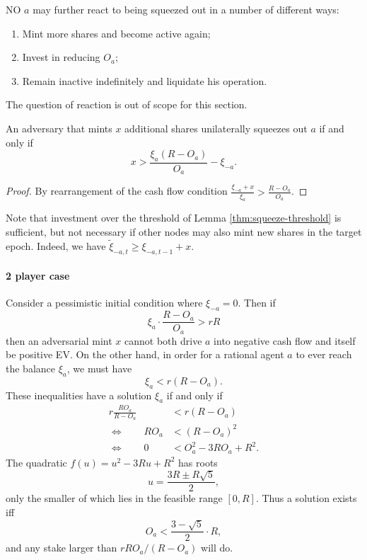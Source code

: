 \begin{remark}
  
  NO $a$ may further react to being squeezed out in a number of different ways:
  \begin{enumerate}
    \item Mint more shares and become active again;
    \item Invest in reducing $O_a$;
    \item Remain inactive indefinitely and liquidate his operation.
  \end{enumerate}
  The question of reaction is out of scope for this section.

\end{remark}

\begin{lemma}
  \label{thm:squeeze-threshold}

  An adversary that mints $x$ additional shares unilaterally squeezes out $a$ if and only if
  \[
    x > \frac { \xi_a(R-O_a) } {O_a} - \xi_{-a}.
  \]

\end{lemma}
%
\begin{proof}

  By rearrangement of the cash flow condition $\frac{\xi_{-a}+x}{\xi_a} > \frac{R-O_a}{O_a}$. \qedhere

\end{proof}

Note that investment over the threshold of Lemma \ref{thm:squeeze-threshold} is sufficient, but not necessary if other nodes may also mint new shares in the target epoch.
%
Indeed, we have $\tilde\xi_{-a,t} \geq \xi_{-a,t-1} + x$.

\paragraph{2 player case}
Consider a pessimistic initial condition where $\xi_{-a}=0$.
%
Then if
\[
  \xi_a\cdot\frac{R-O_a}{O_a} > rR
\]
then an adversarial mint $x$ cannot both drive $a$ into negative cash flow and itself be positive EV.
%
On the other hand, in order for a rational agent $a$ to ever reach the balance $\xi_a$, we must have
\[
  \xi_a< r(R-O_a).
\]
These inequalities have a solution $\xi_a$ if and only if
\begin{align*}
  r\frac{RO_a} {R-O_a} &< r(R-O_a) \\
  \Leftrightarrow \qquad RO_a &< (R-O_a)^2  \\
  \Leftrightarrow \qquad 0 &< O_a^2 - 3RO_a + R^2.
\end{align*}
The quadratic $f(u) = u^2 - 3Ru + R^2$ has roots
\[
  u = \frac{3R \pm R\sqrt{5}} {2},
\]
only the smaller of which lies in the feasible range $[0,R]$.
%
Thus a solution exists iff
\[
  O_a < \frac{3-\sqrt {5}}{2} \cdot R,
\]
and any stake larger than $rRO_a/(R-O_a)$ will do.

